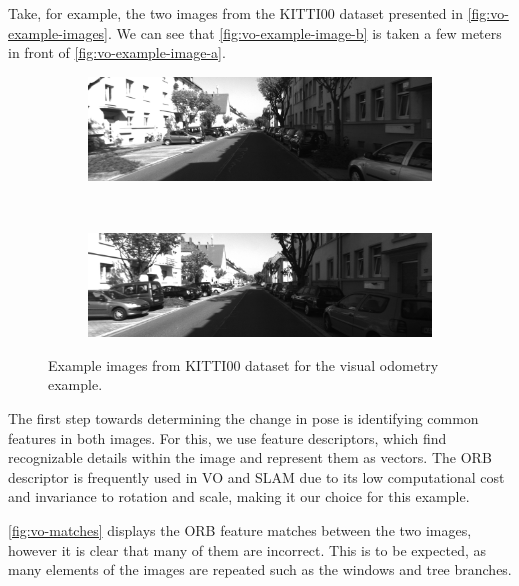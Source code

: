 Take, for example, the two images from the KITTI00 dataset \autocite{Geiger2013IJRR} presented in \autoref{fig:vo-example-images}. We can see that \autoref{fig:vo-example-image-b} is taken a few meters in front of \autoref{fig:vo-example-image-a}.

\begin{figure}[h]
    \centering
    \begin{subfigure}[b]{0.475\textwidth}
        \centering
        \includegraphics[width=\textwidth]{figures/vo_image_8.png}
        \caption{}
        \label{fig:vo-example-image-a}
    \end{subfigure}\hfill%
    ~
    \begin{subfigure}[b]{0.475\textwidth}
        \centering
        \includegraphics[width=\textwidth]{figures/vo_image_9.png}
        \caption{}
        \label{fig:vo-example-image-b}
    \end{subfigure}%
    \caption{Example images from KITTI00 dataset for the visual odometry example.}
    \label{fig:vo-example-images}
\end{figure}

The first step towards determining the change in pose is identifying common features in both images. For this, we use feature descriptors, which find recognizable details within the image and represent them as vectors. The ORB descriptor \autocite{6126544} is frequently used in VO and SLAM due to its low computational cost and invariance to rotation and scale, making it our choice for this example.

\autoref{fig:vo-matches} displays the ORB feature matches between the two images, however it is clear that many of them are incorrect. This is to be expected, as many elements of the images are repeated such as the windows and tree branches.

